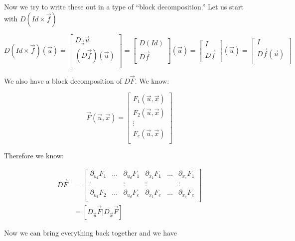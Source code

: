 \documentclass[11 pt, twoside]{article}
\begin{document}
Now we try to write these out in a type of ``block decomposition.'' Let us start
with $D(Id \times \vec{f})$

\[
D(Id \times \vec{f})(\vec{u}) = \left[\begin{array}{c}
D_{\vec{u}}\vec{u} \\
(D\vec{f})(\vec{u}) \\
\end{array}\right]
= \left[\begin{array}{c}
D(Id) \\
D\vec{f}\\
\end{array}\right](\vec{u})
= \left[\begin{array}{c}
I \\
D\vec{f}\\
\end{array}\right] (\vec{u})
=  \left[\begin{array}{c}
I \\
D\vec{f} (\vec{u})\\
\end{array}\right]
\]

We also have a block decomposition of $D\vec{F}$. We know:

\[
\vec{F}(\vec{u}, \vec{x}) = \left[\begin{array}{c}
F_1(\vec{u}, \vec{x}) \\
F_2(\vec{u}, \vec{x}) \\
\vdots \\
F_e(\vec{u}, \vec{x}) \\
\end{array}\right]
\]

Therefore we know:

\begin{align*}
D\vec{F} &= \left[\begin{array}{ccc|ccc}
\partial_{u_1} F_1 & \dots & \partial_{u_d} F_1 & \partial_{x_1}
F_1  & \dots & \partial_{x_e} F_1\\
\vdots & & \vdots & \vdots & & \vdots \\
\partial_{u_1} F_2 & \dots & \partial_{u_d} F_e & \partial_{x_1} F_e
& \dots & \partial_{x_e} F_e\\
\end{array}\right] \\
&= [D_{\vec{u}} \vec{F} | D_{\vec{x}} \vec{F}]
\end{align*}

Now we can bring everything back together and we have
\end{document}
